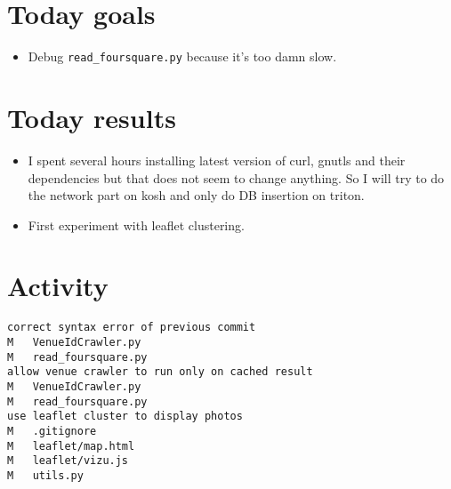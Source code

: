 \section*{Today goals}
\begin{itemize}
	\item Debug \texttt{read\_foursquare.py} because it's too damn slow.
\end{itemize}

\section*{Today results}
\begin{itemize}
	\item I spent several hours installing latest version of curl, gnutls
		and their dependencies but that does not seem to change
		anything. So I will try to do the network part on kosh and only
		do DB insertion on triton.
	\item First experiment with leaflet clustering.
\end{itemize}

\section*{Activity}
\begin{verbatim}
correct syntax error of previous commit
M	VenueIdCrawler.py
M	read_foursquare.py
allow venue crawler to run only on cached result
M	VenueIdCrawler.py
M	read_foursquare.py
use leaflet cluster to display photos
M	.gitignore
M	leaflet/map.html
M	leaflet/vizu.js
M	utils.py
\end{verbatim}
